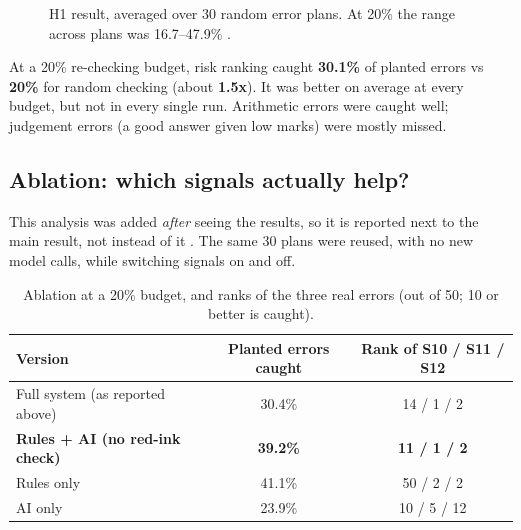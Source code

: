 \begin{figure}[H]
\centering
{}
\caption[H1 result, averaged over 30 random error plans. At 20\% the range across plans was 16.7--47.9\%.]{H1 result, averaged over 30 random error plans. At 20\% the range across plans was 16.7--47.9\% .}
\label{fig:h1}
\end{figure}

\begin{keybox}[H1 result]
At a 20\% re-checking budget, risk ranking caught \textbf{30.1\%} of planted errors vs \textbf{20\%} for random checking
(about \textbf{1.5x}). It was better on average at every budget, but not in every single run. Arithmetic errors were caught
well; judgement errors (a good answer given low marks) were mostly missed.
\end{keybox}


\subsection{Ablation: which signals actually help?}
This analysis was added \emph{after} seeing the results, so it is reported next to the main result, not instead of it
. The same 30 plans were reused, with no new model calls, while switching signals on and off.

\begin{table}[H]
\centering
\small
\caption{Ablation at a 20\% budget, and ranks of the three real errors (out of 50; 10 or better is caught).}
\label{tab:ablation}
\begin{tabular}{@{}lcc@{}}
\toprule
\textbf{Version} & \textbf{Planted errors caught} & \textbf{Rank of S10 / S11 / S12} \\
\midrule
Full system (as reported above) & 30.4\% & 14 / 1 / 2 \\
\textbf{Rules + AI (no red-ink check)} & \textbf{39.2\%} & \textbf{11 / 1 / 2} \\
Rules only & 41.1\% & 50 / 2 / 2 \\
AI only & 23.9\% & 10 / 5 / 12 \\
\bottomrule
\end{tabular}
\end{table}


